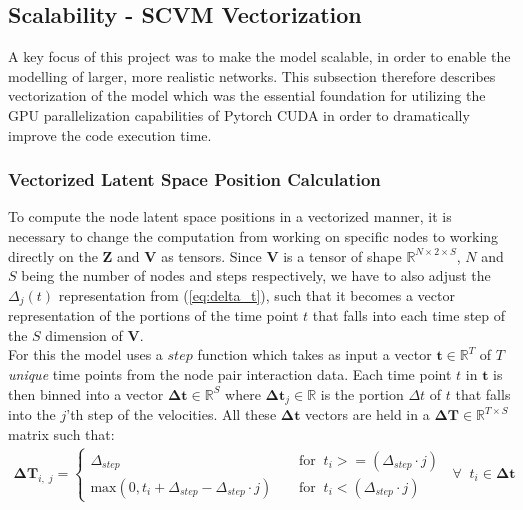\subsection{Scalability - SCVM Vectorization}
\label{sec:Method:Scalability}
A key focus of this project was to make the model scalable, in order to enable the modelling of larger, more realistic networks.
This subsection therefore describes vectorization of the model which was the essential foundation for utilizing the GPU parallelization capabilities of Pytorch CUDA\cite{CUDADocumentation} in order to dramatically improve the code execution time.

\subsubsection{Vectorized Latent Space Position Calculation}
\label{sec:Method:LatentSpacePositionCalculation}
To compute the node latent space positions in a vectorized manner, it is necessary to change the computation from working on specific nodes to working directly on the $\textbf{Z}$ and $\textbf{V}$ as tensors. Since $\textbf{V}$ is a tensor of shape $\mathbb{R}^{N \times 2 \times S}$, $N$ and $S$ being the number of nodes and steps respectively, we have to also adjust the $\Delta_j(t)$ representation from (\ref{eq:delta_t}), such that it becomes a vector representation of the portions of the time point $t$ that falls into each time step of the $S$ dimension of $\textbf{V}$.
\\
For this the model uses a $step$ function which takes as input a vector $\textbf{t} \in \mathbb{R}^{T}$ of $T$ \textit{unique} time points from the node pair interaction data. Each time point $t$ in $\textbf{t}$ is then binned into a vector $\boldsymbol{\Delta}\textbf{t} \in \mathbb{R}^{S}$ where $\boldsymbol{\Delta}\textbf{t}_j \in \mathbb{R}$ is the portion $\Delta t$ of $t$ that falls into the $j$'th step of the velocities. All these $\boldsymbol{\Delta}\textbf{t}$ vectors are held in a $\boldsymbol{\Delta}\textbf{T} \in \mathbb{R}^{T \times S}$ matrix such that:
\begin{align}
    \boldsymbol{\Delta}\textbf{T}_{i,\;j} =
    \begin{cases}
        \Delta_{step} \;\; &\text{for} \;\; t_i >= (\Delta_{step} \cdot j) \\
        \text{max}(0, t_i + \Delta_{step} - \Delta_{step} \cdot j) \;\; \;\; &\text{for} \;\; t_i < (\Delta_{step} \cdot j)
    \end{cases}
    \;\; \forall \;\; t_i \in \boldsymbol{\Delta}\textbf{t}
\end{align}
